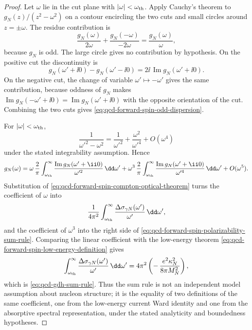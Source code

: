\begin{proof}
Let \(\omega\) lie in the cut plane with \(|\omega|<\omega_{\rm th}\).  Apply
Cauchy's theorem to \(g_N(z)/(z^2-\omega^2)\) on a contour encircling the two
cuts and small circles around \(z=\pm\omega\).  The residue contribution is
\[
  \frac{g_N(\omega)}{2\omega}
  +
  \frac{g_N(-\omega)}{-2\omega}
  =
  \frac{g_N(\omega)}{\omega},
\]
because \(g_N\) is odd.  The large circle gives no contribution by
hypothesis.  On the positive cut the discontinuity is
\[
  g_N(\omega'+\ii0)-g_N(\omega'-\ii0)
  =
  2\ii\,\operatorname{Im}g_N(\omega'+\ii0).
\]
On the negative cut, the change of variable \(\omega'\mapsto-\omega'\) gives
the same contribution, because oddness of \(g_N\) makes
\(\operatorname{Im}g_N(-\omega'+\ii0)=
\operatorname{Im}g_N(\omega'+\ii0)\) with the opposite orientation of the
cut.  Combining the two cuts gives
\eqref{eq:qcd-forward-spin-odd-dispersion}.

For \(|\omega|<\omega_{\rm th}\),
\[
  \frac{1}{\omega'^2-\omega^2}
  =
  \frac{1}{\omega'^2}
  +
  \frac{\omega^2}{\omega'^4}
  +O(\omega^4)
\]
under the stated integrability assumption.  Hence
\[
  g_N(\omega)
  =
  \omega\,\frac{2}{\pi}
  \int_{\omega_{\rm th}}^\infty
  \frac{\operatorname{Im}g_N(\omega'+\ii0)}{\omega'^2}\,\dd\omega'
  +
  \omega^3\,\frac{2}{\pi}
  \int_{\omega_{\rm th}}^\infty
  \frac{\operatorname{Im}g_N(\omega'+\ii0)}{\omega'^4}\,\dd\omega'
  +O(\omega^5).
\]
Substitution of
\eqref{eq:qcd-forward-spin-compton-optical-theorem} turns the coefficient of
\(\omega\) into
\[
  \frac{1}{4\pi^2}
  \int_{\omega_{\rm th}}^\infty
  \frac{\Delta\sigma_{\gamma N}(\omega')}{\omega'}\,\dd\omega',
\]
and the coefficient of \(\omega^3\) into the right side of
\eqref{eq:qcd-forward-spin-polarizability-sum-rule}.  Comparing the linear
coefficient with the low-energy theorem
\eqref{eq:qcd-forward-spin-low-energy-definition} gives
\[
  \int_{\omega_{\rm th}}^\infty
  \frac{\Delta\sigma_{\gamma N}(\omega')}{\omega'}\,\dd\omega'
  =
  4\pi^2\left(-\,\frac{e^2\kappa_N^2}{8\pi M_N^2}\right),
\]
which is \eqref{eq:qcd-gdh-sum-rule}.  Thus the sum rule is not an independent
model assumption about nucleon structure; it is the equality of two
definitions of the same coefficient, one from the low-energy current Ward
identity and one from the absorptive spectral representation, under the stated
analyticity and boundedness hypotheses.
\end{proof}

